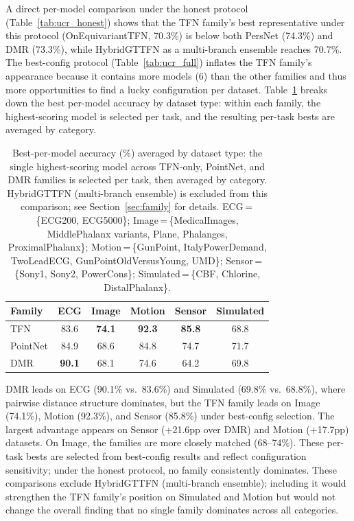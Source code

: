 \documentclass[a4paper,11pt]{article}
\begin{document}
A direct per-model comparison under the honest protocol (Table~\ref{tab:ucr_honest}) shows that the TFN family's best representative under this protocol (OnEquivariantTFN, 70.3\%) is below both PersNet (74.3\%) and DMR (73.3\%), while HybridGTTFN as a multi-branch ensemble reaches 70.7\%.
The best-config protocol (Table~\ref{tab:ucr_full}) inflates the TFN family's appearance because it contains more models (6) than the other families and thus more opportunities to find a lucky configuration per dataset.
Table~\ref{tab:family_type} breaks down the best per-model accuracy by dataset type: within each family, the highest-scoring model is selected per task, and the resulting per-task bests are averaged by category.
\begin{table}[ht]
\centering
\caption{Best-per-model accuracy (\%) averaged by dataset type: the single highest-scoring model across TFN-only, PointNet, and DMR families is selected per task, then averaged by category. HybridGTTFN (multi-branch ensemble) is excluded from this comparison; see Section~\ref{sec:family} for details. ECG\,=\,\{ECG200, ECG5000\}; Image\,=\,\{MedicalImages, MiddlePhalanx variants, Plane, Phalanges, ProximalPhalanx\}; Motion\,=\,\{GunPoint, ItalyPowerDemand, TwoLeadECG, GunPointOldVersusYoung, UMD\}; Sensor\,=\,\{Sony1, Sony2, PowerCons\}; Simulated\,=\,\{CBF, Chlorine, DistalPhalanx\}.}
\label{tab:family_type}
\small
\begin{tabular}{lccccc}
\toprule
Family & ECG & Image & Motion & Sensor & Simulated \\
\midrule
TFN & 83.6 & \textbf{74.1} & \textbf{92.3} & \textbf{85.8} & 68.8 \\
PointNet & 84.9 & 68.6 & 84.8 & 74.7 & 71.7 \\
DMR & \textbf{90.1} & 68.1 & 74.6 & 64.2 & 69.8 \\
\bottomrule
\end{tabular}
\end{table}

DMR leads on ECG (90.1\% vs.\ 83.6\%) and Simulated (69.8\% vs.\ 68.8\%), where pairwise distance structure dominates, but the TFN family leads on Image (74.1\%), Motion (92.3\%), and Sensor (85.8\%) under best-config selection.
The largest advantage appears on Sensor (+21.6pp over DMR) and Motion (+17.7pp) datasets.
On Image, the families are more closely matched (68--74\%).
These per-task bests are selected from best-config results and reflect configuration sensitivity; under the honest protocol, no family consistently dominates.
These comparisons exclude HybridGTTFN (multi-branch ensemble); including it would strengthen the TFN family's position on Simulated and Motion but would not change the overall finding that no single family dominates across all categories.
\end{document}
